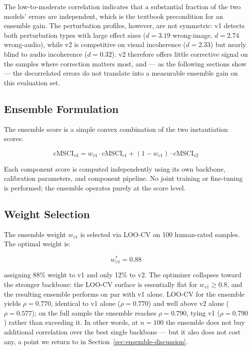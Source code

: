 \documentclass[a4paper,fleqn]{cas-sc}
\begin{document}
\begin{itemize}
The low-to-moderate correlation indicates that a substantial fraction of the two models' errors are independent, which is the textbook precondition for an ensemble gain. The perturbation profiles, however, are not symmetric: v1 detects both perturbation types with large effect sizes ($d = 3.19$ wrong-image, $d = 2.74$ wrong-audio), while v2 is competitive on visual incoherence ($d = 2.33$) but nearly blind to audio incoherence ($d = 0.32$). v2 therefore offers little corrective signal on the samples where correction matters most, and — as the following sections show — the decorrelated errors do not translate into a measurable ensemble gain on this evaluation set.

\subsection{Ensemble Formulation}\label{sec:v3-formulation}

The ensemble score is a simple convex combination of the two instantiation scores:

\begin{equation}\label{eq:v3-ensemble}
\mathrm{cMSCI}_{v3} = w_{v1} \cdot \mathrm{cMSCI}_{v1} + (1 - w_{v1}) \cdot \mathrm{cMSCI}_{v2}
\end{equation}

Each component score is computed independently using its own backbone, calibration parameters, and component pipeline. No joint training or fine-tuning is performed; the ensemble operates purely at the score level.

\subsection{Weight Selection}\label{sec:v3-weight}

The ensemble weight $w_{v1}$ is selected via LOO-CV on 100 human-rated samples. The optimal weight is:

\begin{equation}\label{eq:v3-weight-opt}
w_{v1}^{*} = 0.88
\end{equation}

assigning 88\% weight to v1 and only 12\% to v2. The optimizer collapses toward the stronger backbone: the LOO-CV surface is essentially flat for $w_{v1} \geq 0.8$, and the resulting ensemble performs on par with v1 alone. LOO-CV for the ensemble yields $\rho = 0.770$, identical to v1 alone ($\rho = 0.770$) and well above v2 alone ($\rho = 0.577$); on the full sample the ensemble reaches $\rho = 0.790$, tying v1 ($\rho = 0.790$) rather than exceeding it. In other words, at $n = 100$ the ensemble does not buy additional correlation over the best single backbone — but it also does not cost any, a point we return to in Section~\ref{sec:ensemble-discussion}.


\end{itemize}
\end{document}
